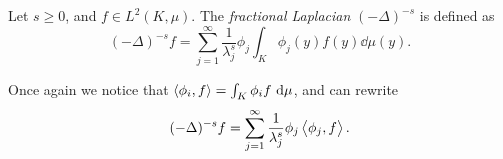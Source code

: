 \medskip
\begin{defi}\label{fracLaplacian}
	Let $s \geq 0$, and $f \in L^2(K, \mu)$. The \emph{fractional Laplacian} $(-\Delta)^{-s}$ is defined as
	\begin{equation}
		(-\Delta)^{-s}f = \sum_{j = 1}^{\infty} \frac{1}{\lambda_{j}^{s}} \phi_j \int_{K} \phi_j(y)f(y) \dd \mu(y).
	\end{equation}
\end{defi}
\begin{remark}
	Once again we notice that $\left\langle \phi_i, f \right\rangle = \int_{K} \phi_i f \ \text{d} \mu$, and can rewrite
	\begin{equation}
		(-\Delta)^{-s} f = \sum_{j = 1}^{\infty} \frac{1}{\lambda_j^{s}} \phi_j \inn{\phi_j}{f}.
	\end{equation}
\end{remark}

